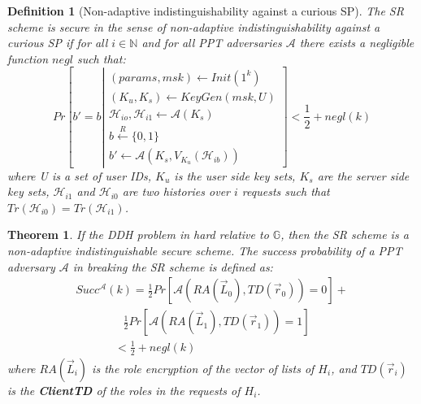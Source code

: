 \documentclass[final,5p,times,twocolumn]{elsarticle}
\newtheorem{definition}{Definition}
\newtheorem{theorem}{Theorem}
\begin{document}
\begin{definition}[Non-adaptive indistinguishability against a curious SP]
The SR scheme is secure in the sense of non-adaptive indistinguishability against a curious SP if for all $i \in \mathbb{N}$ and for all PPT adversaries $\mathcal{A}$ there exists a negligible function $negl$ such that:
\begin{equation}
Pr \left[ b'=b \left|
\begin{array}{lll}
(params, msk) \leftarrow Init(1^k)\\
(K_u,K_s) \leftarrow KeyGen(msk,U)\\
\mathcal{H}_{io},\mathcal{H}_{i1} \leftarrow \mathcal{A}(K_s)\\
b \xleftarrow{R} \{0,1\}\\
b' \leftarrow \mathcal{A}(K_s,V_{K_u}(\mathcal{H}_{ib}))
\end{array}
\right]<\frac{1}{2}+negl(k)
\right.
\end{equation}
where U is a set of user IDs, $K_u$ is the user side key sets, $K_s$ are the server side key sets, $\mathcal{H}_{i1}$ and $\mathcal{H}_{i0}$ are two histories over $i$ requests such that $Tr(\mathcal{H}_{i0}) = Tr(\mathcal{H}_{i1})$.
\end{definition}

\begin{theorem}\label{thm:3}
If the DDH problem in hard relative to $\mathbb{G}$, then the SR scheme is a non-adaptive indistinguishable secure scheme. The success probability of a PPT adversary $\mathcal{A}$ in breaking the SR scheme is defined as:
\begin{equation}
\begin{array}{l}
Succ^{\mathcal{A}}(k)=  \frac{1}{2}Pr[\mathcal{A}(RA(\vec{L}_0),TD(\vec{r}_0))=0]+ \\
\hspace{50pt} \frac{1}{2}Pr[\mathcal{A}(RA(\vec{L}_1),TD(\vec{r}_1))=1] \\
\hspace{41pt} < \frac{1}{2} + negl(k)
\end{array}
\end{equation}
where $RA(\vec{L}_i)$ is the role encryption of the vector of lists of $H_i$, and $TD(\vec{r}_i)$ is the \textbf{ClientTD} of the roles in the requests of $H_i$.
\end{theorem}
\end{document}
